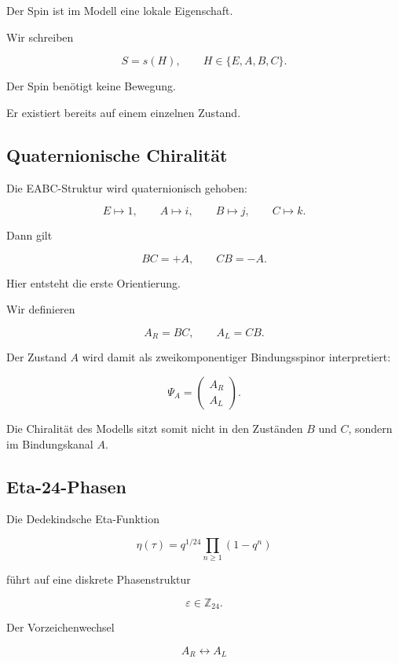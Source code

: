 \documentclass[11pt,a4paper]{article}
\theoremstyle{definition}
\theoremstyle{remark}
\begin{document}
	Der Spin ist im Modell eine lokale Eigenschaft.
	
	Wir schreiben
	
	\[
	S=s(H),
	\qquad
	H\in\{E,A,B,C\}.
	\]
	
	Der Spin benötigt keine Bewegung.
	
	Er existiert bereits auf einem einzelnen Zustand.
	
	
	\subsection{Quaternionische Chiralität}
	
	Die EABC-Struktur wird quaternionisch gehoben:
	
	\[
	E\mapsto1,
	\qquad
	A\mapsto i,
	\qquad
	B\mapsto j,
	\qquad
	C\mapsto k.
	\]
	
	Dann gilt
	
	\[
	BC=+A,
	\qquad
	CB=-A.
	\]
	
	Hier entsteht die erste Orientierung.
	
	Wir definieren
	
	\[
	A_R=BC,
	\qquad
	A_L=CB.
	\]
	
	Der Zustand \(A\) wird damit als
	zweikomponentiger Bindungsspinor interpretiert:
	
	\[
	\Psi_A=
	\begin{pmatrix}
	A_R\\
	A_L
	\end{pmatrix}.
	\]
	
	Die Chiralität des Modells sitzt somit
	nicht in den Zuständen \(B\) und \(C\),
	sondern im Bindungskanal \(A\).
	
	
	\subsection{Eta-24-Phasen}
	
	Die Dedekindsche Eta-Funktion
	
	\[
	\eta(\tau)
	=
	q^{1/24}
	\prod_{n\ge1}(1-q^n)
	\]
	
	führt auf eine diskrete Phasenstruktur
	
	\[
	\varepsilon
	\in
	\mathbb Z_{24}.
	\]
	
	Der Vorzeichenwechsel
	
	\[
	A_R
	\leftrightarrow
	A_L
	\]
	
\end{document}
